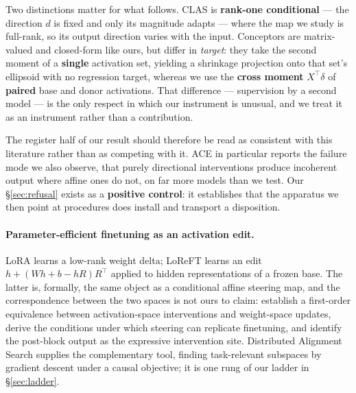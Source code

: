 \documentclass{article}
\begin{document}
Two distinctions matter for what follows. CLAS is \textbf{rank-one conditional} --- the direction
$d$ is fixed and only its magnitude adapts --- where the map we study is full-rank, so its output
direction varies with the input. Conceptors are matrix-valued and closed-form like ours, but differ
in \emph{target}: they take the second moment of a \textbf{single} activation set, yielding a
shrinkage projection onto that set's ellipsoid with no regression target, whereas we use the
\textbf{cross moment} $X^\top\delta$ of \textbf{paired} base and donor activations. That difference
--- supervision by a second model --- is the only respect in which our instrument is unusual, and we
treat it as an instrument rather than a contribution.

The register half of our result should therefore be read as consistent with this literature rather
than as competing with it. ACE in particular reports the failure mode we also observe, that purely
directional interventions produce incoherent output where affine ones do not, on far more models
than we test. Our \S\ref{sec:refusal} exists as a \textbf{positive control}: it establishes that
the apparatus we then point at procedures does install and transport a disposition.

\paragraph{Parameter-efficient finetuning as an activation edit.}
LoRA \citep{hu2022lora} learns a low-rank weight delta; LoReFT \citep{wu2024reft} learns an edit
$h + (Wh + b - hR)R^\top$ applied to hidden representations of a frozen base. The latter is,
formally, the same object as a conditional affine steering map, and the correspondence between the
two spaces is not ours to claim: \citet{adila2026weightshifts} establish a first-order equivalence
between activation-space interventions and weight-space updates, derive the conditions under which
steering can replicate finetuning, and identify the post-block output as the expressive
intervention site. Distributed Alignment Search \citep{geiger2024das} supplies the complementary
tool, finding task-relevant subspaces by gradient descent under a causal objective; it is one rung
of our ladder in \S\ref{sec:ladder}.
\end{document}

